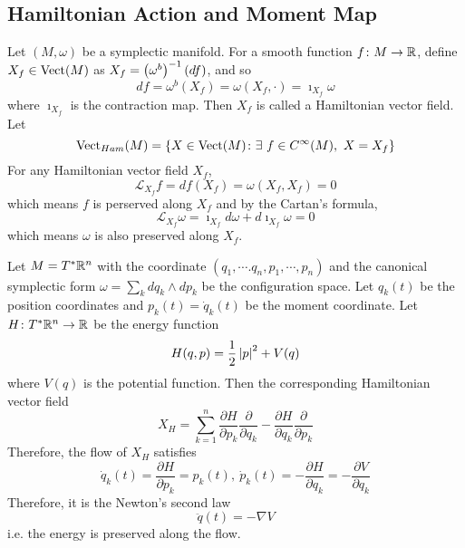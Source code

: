 \documentclass[a4paper,12pt]{article}
\begin{document}
	\subsection{Hamiltonian Action and Moment Map}

	Let $(M,\omega)$ be a symplectic manifold. For a smooth function $f \colon M \rightarrow \mathbb{R}$, define $X_f \in \operatorname{Vect}(M)$ as $X_f = \left(\omega^b\right)^{-1}(df)$, and so
	\begin{equation*}
		df = \omega^b(X_f) = \omega(X_f,\cdot) = \imath_{X_f}\omega
	\end{equation*}
	where $\imath_{X_f}$ is the contraction map. Then $X_f$ is called a Hamiltonian vector field. Let
	\begin{equation*}
		\operatorname{Vect}_{Ham}(M) = \left\{X \in \operatorname{Vect}(M) \colon \exists~f \in C^{\infty}(M),~X = X_f\right\}
	\end{equation*}
	For any Hamiltonian vector field $X_f$,
	\begin{equation*}
		\mathcal{L}_{X_f}f = df(X_f) = \omega(X_f,X_f) = 0
	\end{equation*}
	which means $f$ is perserved along $X_f$ and by the Cartan's formula,
	\begin{equation*}
		\mathcal{L}_{X_f}\omega =  \imath_{X_f} d \omega + d  \imath_{X_f} \omega = 0
	\end{equation*}
	which means $\omega$ is also preserved along $X_f$.
	
	\begin{exam}
		Let $M = T^*\mathbb{R}^n$ with the coordinate $(q_1,\cdots.q_n,p_1,\cdots,p_n)$ and the canonical symplectic form $\omega = \sum_k dq_k \wedge dp_k$ be the configuration space. Let $q_k(t)$ be the position coordinates and $p_k(t) = \dot{q}_k(t)$ be the moment coordinate. Let $H \colon T^*\mathbb{R}^n \rightarrow \mathbb{R}$  be the energy function
		\begin{equation*}
		 	H(q,p) = \frac{1}{2}\left\lvert p\right\lvert^2 + V(q)
		\end{equation*}
		where $V(q)$ is the potential function. Then the corresponding Hamiltonian vector field
		\begin{equation*}
			X_H  = \sum_{k=1}^n \frac{\partial H}{\partial p_k}\frac{\partial }{\partial q_k} - \frac{\partial H}{\partial q_k}\frac{\partial }{\partial p_k}
		\end{equation*}
		Therefore, the flow of $X_H$ satisfies
		\begin{equation*}
			\dot{q}_k(t) = \frac{\partial H}{\partial p_k} = p_k(t),~\dot{p}_k(t) = -\frac{\partial H}{\partial q_k} = -\frac{\partial V}{\partial q_k}
		\end{equation*}
		Therefore, it is the Newton's second law
		\begin{equation*}
			\ddot{q}(t) = -\nabla V
		\end{equation*}
		i.e. the energy is preserved along the flow.
	\end{exam}
\end{document}
